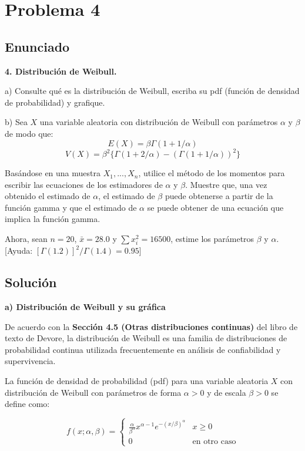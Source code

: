 \documentclass[12pt]{article}
\begin{document}
\section{Problema 4}

\subsection{Enunciado}

\textbf{4. Distribución de Weibull.}

a) Consulte qué es la distribución de Weibull, escriba su pdf (función de densidad de probabilidad) y grafique.

b) Sea $X$ una variable aleatoria con distribución de Weibull con parámetros $\alpha$ y $\beta$ de modo que:
$$ E(X) = \beta\Gamma(1 + 1/\alpha) $$
$$ V(X) = \beta^2\{\Gamma(1 + 2/\alpha) - (\Gamma(1 + 1/\alpha))^2\} $$

Basándose en una muestra $X_1, ..., X_n$, utilice el método de los momentos para escribir las ecuaciones de los estimadores de $\alpha$ y $\beta$. Muestre que, una vez obtenido el estimado de $\alpha$, el estimado de $\beta$ puede obtenerse a partir de la función gamma y que el estimado de $\alpha$ se puede obtener de una ecuación que implica la función gamma.

Ahora, sean $n = 20$, $\bar{x} = 28.0$ y $\sum x_i^2 = 16500$, estime los parámetros $\beta$ y $\alpha$. [Ayuda: $[\Gamma(1.2)]^2 /\Gamma(1.4) = 0.95$]

\subsection{Solución}

\textbf{a) Distribución de Weibull y su gráfica}

De acuerdo con la \textbf{Sección 4.5 (Otras distribuciones continuas)} del libro de texto de Devore, la distribución de Weibull es una familia de distribuciones de probabilidad continua utilizada frecuentemente en análisis de confiabilidad y supervivencia.

La función de densidad de probabilidad (pdf) para una variable aleatoria $X$ con distribución de Weibull con parámetros de forma $\alpha > 0$ y de escala $\beta > 0$ se define como:

$$ f(x; \alpha, \beta) = \begin{cases} 
\frac{\alpha}{\beta^\alpha} x^{\alpha-1} e^{-(x/\beta)^\alpha} & x \geq 0 \\
0 & \text{en otro caso}
\end{cases} $$
\end{document}
